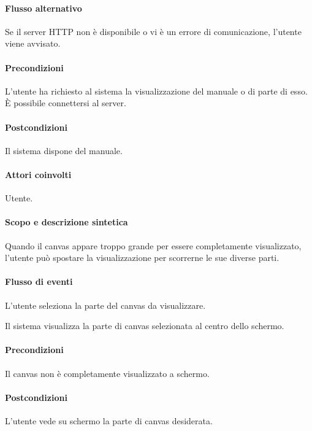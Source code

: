 \paragraph{Flusso alternativo}
Se il server HTTP non \`e disponibile o vi \`e un errore di comunicazione, l'utente viene avvisato.
\paragraph{Precondizioni} L'utente ha richiesto al sistema la visualizzazione del manuale o di parte di esso. \`E possibile connettersi al server.
\paragraph{Postcondizioni} Il sistema dispone del manuale.

\paragraph{Attori coinvolti} Utente.
\paragraph{Scopo e descrizione sintetica}
Quando il canvas appare troppo grande per essere completamente visualizzato, l'utente pu\`o spostare la visualizzazione per scorrerne le sue diverse parti.
\paragraph{Flusso di eventi}
\begin{elenconumerato}[\textbf{}]{\subsubsecindent}
\item L'utente seleziona la parte del canvas da visualizzare.
\item Il sistema visualizza la parte di canvas selezionata al centro dello schermo.
\end{elenconumerato}
\paragraph{Precondizioni} Il canvas non \`e completamente visualizzato a schermo.
\paragraph{Postcondizioni} L'utente vede su schermo la parte di canvas desiderata.

